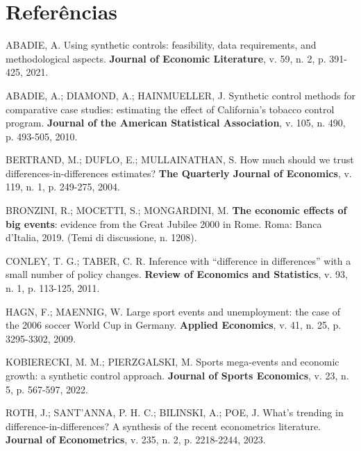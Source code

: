 \documentclass[11pt,a4paper]{article}
\begin{document}
\section*{Referências}
\begin{small}\setlength{\parindent}{0pt}\setlength{\parskip}{4pt}\raggedright

ABADIE, A. Using synthetic controls: feasibility, data requirements, and methodological aspects. \textbf{Journal of Economic Literature}, v. 59, n. 2, p. 391-425, 2021.

ABADIE, A.; DIAMOND, A.; HAINMUELLER, J. Synthetic control methods for comparative case studies: estimating the effect of California's tobacco control program. \textbf{Journal of the American Statistical Association}, v. 105, n. 490, p. 493-505, 2010.

BERTRAND, M.; DUFLO, E.; MULLAINATHAN, S. How much should we trust differences-in-differences estimates? \textbf{The Quarterly Journal of Economics}, v. 119, n. 1, p. 249-275, 2004.

BRONZINI, R.; MOCETTI, S.; MONGARDINI, M. \textbf{The economic effects of big events}: evidence from the Great Jubilee 2000 in Rome. Roma: Banca d'Italia, 2019. (Temi di discussione, n. 1208).

CONLEY, T. G.; TABER, C. R. Inference with ``difference in differences'' with a small number of policy changes. \textbf{Review of Economics and Statistics}, v. 93, n. 1, p. 113-125, 2011.

HAGN, F.; MAENNIG, W. Large sport events and unemployment: the case of the 2006 soccer World Cup in Germany. \textbf{Applied Economics}, v. 41, n. 25, p. 3295-3302, 2009.

KOBIERECKI, M. M.; PIERZGALSKI, M. Sports mega-events and economic growth: a synthetic control approach. \textbf{Journal of Sports Economics}, v. 23, n. 5, p. 567-597, 2022.

ROTH, J.; SANT'ANNA, P. H. C.; BILINSKI, A.; POE, J. What's trending in difference-in-differences? A synthesis of the recent econometrics literature. \textbf{Journal of Econometrics}, v. 235, n. 2, p. 2218-2244, 2023.
\end{small}
\end{document}
